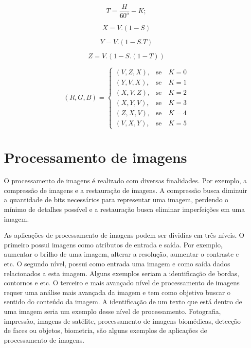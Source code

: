\documentclass[	12pt, Times, openright, twoside, a4paper, english, brazil]{abntex2}
\begin{document}
\begin{equation}
\label{eq:hsv2rgbT}
    T = \frac{H}{60^o} - K;
\end{equation}

\begin{equation}
\label{eq:hsv2rgbX}
    X = V . (1 - S)
\end{equation}

\begin{equation}
\label{eq:hsv2rgbY}
    Y = V . (1 - S . T)
\end{equation}

\begin{equation}
\label{eq:hsv2rgbZ}
    Z = V . (1 - S . (1 - T))
\end{equation}

\begin{equation}
\label{eq:hsv2rgbRGB}
(R,G,B)=\left\{
\begin{array}{rc}

    (V,Z,X),&\mbox{se}\quad K = 0 \\
    (Y,V,X),&\mbox{se}\quad K = 1 \\
    (X,V,Z),&\mbox{se}\quad K = 2 \\
    (X,Y,V),&\mbox{se}\quad K = 3 \\
    (Z,X,V),&\mbox{se}\quad K = 4 \\
    (V,X,Y),&\mbox{se}\quad K = 5
    

\end{array}\right.
\end{equation}











\section{Processamento de imagens}

O processamento de imagens é realizado com diversas finalidades. Por exemplo, a compressão de imagens e a restauração de imagens. A compressão busca diminuir a quantidade de bits necessários para representar uma imagem, perdendo o mínimo de detalhes possível e a restauração busca eliminar imperfeições em uma imagem. 

As aplicações de processamento de imagens podem ser dividias em três níveis. O primeiro possui imagens como atributos de entrada e saída. Por exemplo, aumentar o brilho de uma imagem, alterar a resolução, aumentar o contraste e etc. O segundo nível, possui como entrada uma imagem e como saída dados relacionados a esta imagem. Alguns exemplos seriam a identificação de bordas, contornos e etc. O terceiro e mais avançado nível de processamento de imagens requer uma análise mais avançada da imagem e tem como objetivo buscar o sentido do conteúdo da imagem. A identificação de um texto que está dentro de uma imagem seria um exemplo desse nível de processamento. Fotografia, impressão, imagens de satélite, processamento de imagens biomédicas, detecção de faces ou objetos, biometria, são alguns exemplos de aplicações de processamento de imagens.
\end{document}
